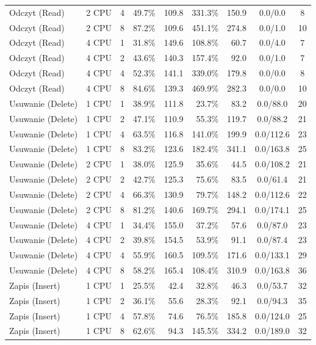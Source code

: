 \begin{table}[ht]
{\begin{tabular}{llcrrrrcc}
Odczyt (Read) & 2 CPU & 4 & 49.7\% & 109.8 & 331.3\% & 150.9 & 0.0/0.0 & 8 \\
Odczyt (Read) & 2 CPU & 8 & 87.2\% & 109.6 & 451.1\% & 274.8 & 0.0/1.0 & 10 \\
Odczyt (Read) & 4 CPU & 1 & 31.8\% & 149.6 & 108.8\% & 60.7 & 0.0/4.0 & 7 \\
Odczyt (Read) & 4 CPU & 2 & 43.6\% & 140.3 & 157.4\% & 92.0 & 0.0/1.0 & 7 \\
Odczyt (Read) & 4 CPU & 4 & 52.3\% & 141.1 & 339.0\% & 179.8 & 0.0/0.0 & 8 \\
Odczyt (Read) & 4 CPU & 8 & 84.6\% & 139.3 & 469.9\% & 282.3 & 0.0/0.0 & 10 \\
Usuwanie (Delete) & 1 CPU & 1 & 38.9\% & 111.8 & 23.7\% & 83.2 & 0.0/88.0 & 20 \\
Usuwanie (Delete) & 1 CPU & 2 & 47.1\% & 110.9 & 55.3\% & 119.7 & 0.0/88.2 & 21 \\
Usuwanie (Delete) & 1 CPU & 4 & 63.5\% & 116.8 & 141.0\% & 199.9 & 0.0/112.6 & 23 \\
Usuwanie (Delete) & 1 CPU & 8 & 83.2\% & 123.6 & 182.4\% & 341.1 & 0.0/163.8 & 25 \\
Usuwanie (Delete) & 2 CPU & 1 & 38.0\% & 125.9 & 35.6\% & 44.5 & 0.0/108.2 & 21 \\
Usuwanie (Delete) & 2 CPU & 2 & 42.7\% & 125.3 & 75.6\% & 83.5 & 0.0/61.4 & 21 \\
Usuwanie (Delete) & 2 CPU & 4 & 66.3\% & 130.9 & 79.7\% & 148.2 & 0.0/112.6 & 22 \\
Usuwanie (Delete) & 2 CPU & 8 & 81.2\% & 140.6 & 169.7\% & 294.1 & 0.0/174.1 & 25 \\
Usuwanie (Delete) & 4 CPU & 1 & 34.4\% & 155.0 & 37.2\% & 57.6 & 0.0/87.0 & 23 \\
Usuwanie (Delete) & 4 CPU & 2 & 39.8\% & 154.5 & 53.9\% & 91.1 & 0.0/87.4 & 23 \\
Usuwanie (Delete) & 4 CPU & 4 & 55.9\% & 160.5 & 109.5\% & 171.6 & 0.0/133.1 & 29 \\
Usuwanie (Delete) & 4 CPU & 8 & 58.2\% & 165.4 & 108.4\% & 310.9 & 0.0/163.8 & 36 \\
Zapis (Insert) & 1 CPU & 1 & 25.5\% & 42.4 & 32.8\% & 46.3 & 0.0/53.7 & 32 \\
Zapis (Insert) & 1 CPU & 2 & 36.1\% & 55.6 & 28.3\% & 92.1 & 0.0/94.3 & 35 \\
Zapis (Insert) & 1 CPU & 4 & 57.8\% & 74.6 & 76.5\% & 185.8 & 0.0/124.0 & 25 \\
Zapis (Insert) & 1 CPU & 8 & 62.6\% & 94.3 & 145.5\% & 334.2 & 0.0/189.0 & 32 \\

\end{tabular}}
\end{table}
